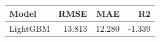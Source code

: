 \begin{tabular}{lrrr}
\toprule
Model & RMSE & MAE & R2 \\
\midrule
LightGBM & 13.813 & 12.280 & -1.339 \\
\bottomrule
\end{tabular}
